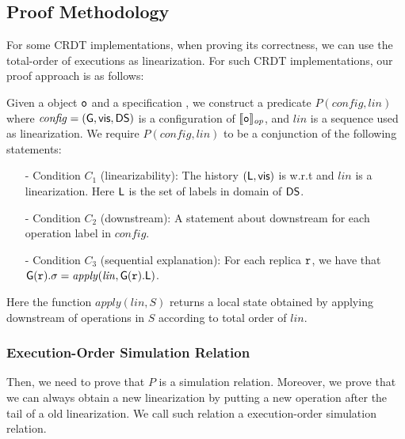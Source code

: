 \subsection{Proof Methodology}

For some CRDT implementations, when proving its correctness, we can use the total-order of executions as linearization. For such CRDT implementations, our proof approach is as follows:


Given a object $\mathtt{o}$ and a specification \Spec{}, we construct a predicate $P(\mathit{config},\mathit{lin})$ where $\mathit{config} = (\mathsf{G}, \mathsf{vis}, \mathsf{DS})$ is a configuration of $\llbracket \mathtt{o} \rrbracket_{\mathit{op}}$, and $\mathit{lin}$ is a sequence used as linearization. We require $P(\mathit{config},\mathit{lin})$ to be a conjunction of the following statements:

\begin{itemize}
\setlength{\itemsep}{0.5pt}
\item[-] Condition $C_1$ (linearizability): The history $(\mathsf{L}, \mathsf{vis})$ is \crdtlinearizable{} w.r.t \Spec{} and $\mathit{lin}$ is a linearization. Here $\mathsf{L}$ is the set of labels in domain of $\mathsf{DS}$.

\item[-] Condition $C_2$ (downstream): A statement about downstream for each operation label in $\mathit{config}$.

\item[-] Condition $C_3$ (sequential explanation): For each replica $\mathtt{r}$, we have that $\mathsf{G}(\mathtt{r}).\sigma = \mathit{apply}(\mathit{lin},\mathsf{G}(\mathtt{r}).\mathsf{L})$.
\end{itemize}

Here the function $\mathit{apply}(\mathit{lin},S)$ returns a local state obtained by applying downstream of operations in $S$ according to total order of $\mathit{lin}$.

\subsubsection{Execution-Order Simulation Relation}
\label{subsec:time order of execution as linearization}

Then, we need to prove that $P$ is a simulation relation. Moreover, we prove that we can always obtain a new linearization by putting a new operation after the tail of a old linearization. We call such relation a execution-order simulation relation.

